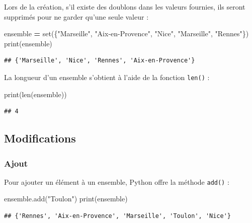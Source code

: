 \documentclass[12pt,]{book}
\newenvironment{Shaded}{\begin{snugshade}}{\end{snugshade}}
\newcommand{\StringTok}[1]{\textcolor[rgb]{0.31,0.60,0.02}{#1}}
\newcommand{\OperatorTok}[1]{\textcolor[rgb]{0.81,0.36,0.00}{\textbf{#1}}}
\newcommand{\BuiltInTok}[1]{#1}
\newcommand{\NormalTok}[1]{#1}
\numberwithin{equation}{section}
\numberwithin{countremarque}{section}
\begin{document}
Lors de la création, s'il existe des doublons dans les valeurs fournies,
ils seront supprimés pour ne garder qu'une seule valeur :

\begin{Shaded}
\begin{Highlighting}[]
\NormalTok{ensemble }\OperatorTok{=} \BuiltInTok{set}\NormalTok{(\{}\StringTok{"Marseille"}\NormalTok{, }\StringTok{"Aix-en-Provence"}\NormalTok{, }\StringTok{"Nice"}\NormalTok{, }\StringTok{"Marseille"}\NormalTok{, }\StringTok{"Rennes"}\NormalTok{\})}
\BuiltInTok{print}\NormalTok{(ensemble)}
\end{Highlighting}
\end{Shaded}

\begin{lstlisting}
## {'Marseille', 'Nice', 'Rennes', 'Aix-en-Provence'}
\end{lstlisting}

La longueur d'un ensemble s'obtient à l'aide de la fonction
\texttt{len()} :

\begin{Shaded}
\begin{Highlighting}[]
\BuiltInTok{print}\NormalTok{(}\BuiltInTok{len}\NormalTok{(ensemble))}
\end{Highlighting}
\end{Shaded}

\begin{lstlisting}
## 4
\end{lstlisting}

\subsection{Modifications}\label{modifications}

\subsubsection{Ajout}\label{ajout}

Pour ajouter un élément à un ensemble, Python offre la méthode
\texttt{add()} :

\begin{Shaded}
\begin{Highlighting}[]
\NormalTok{ensemble.add(}\StringTok{"Toulon"}\NormalTok{)}
\BuiltInTok{print}\NormalTok{(ensemble)}
\end{Highlighting}
\end{Shaded}

\begin{lstlisting}
## {'Rennes', 'Aix-en-Provence', 'Marseille', 'Toulon', 'Nice'}
\end{lstlisting}
\end{document}
